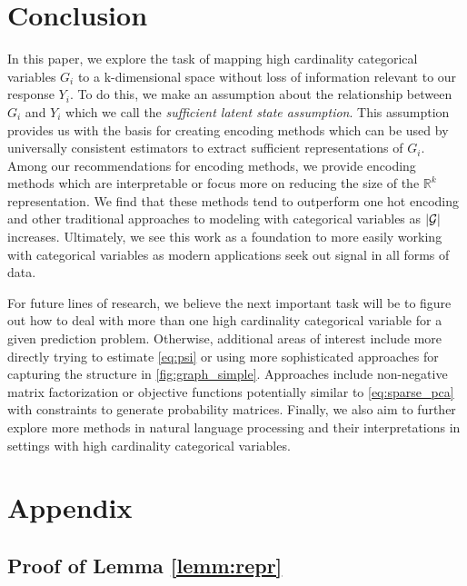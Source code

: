 \documentclass{article}
\theoremstyle{plain}
\theoremstyle{definition}
\theoremstyle{remark}
\begin{document}
\section{Conclusion}
In this paper, we explore the task of mapping high cardinality categorical variables $G_i$ to a k-dimensional space without loss of information relevant to our response $Y_i$. To do this, we make an assumption about the relationship between $G_i$ and $Y_i$ which we call the \textit{sufficient latent state assumption}. This assumption provides us with the basis for creating encoding methods which can be used by universally consistent estimators to extract sufficient representations of $G_i$. Among our recommendations for encoding methods, we provide encoding methods which are interpretable or focus more on reducing the size of the  $\mathbb{R}^k$ representation. We find that these methods tend to outperform one hot encoding and other traditional approaches to modeling with categorical variables as $|\mathcal{G}|$ increases. Ultimately, we see this work as a foundation to more easily working with categorical variables as modern applications seek out signal in all forms of data.


For future lines of research, we believe the next important task will be to figure out how to deal with more than one high cardinality categorical variable for a given prediction problem. Otherwise, additional areas of interest include more directly trying to estimate \ref{eq:psi} or using more sophisticated approaches for capturing the structure in \ref{fig:graph_simple}. Approaches include non-negative matrix factorization or objective functions potentially similar to \ref{eq:sparse_pca} with constraints to generate probability matrices. Finally, we also aim to further explore more methods in natural language processing and their interpretations in settings with high cardinality categorical variables.










\section{Appendix}

\subsection{Proof of Lemma \ref{lemm:repr}}
\end{document}
